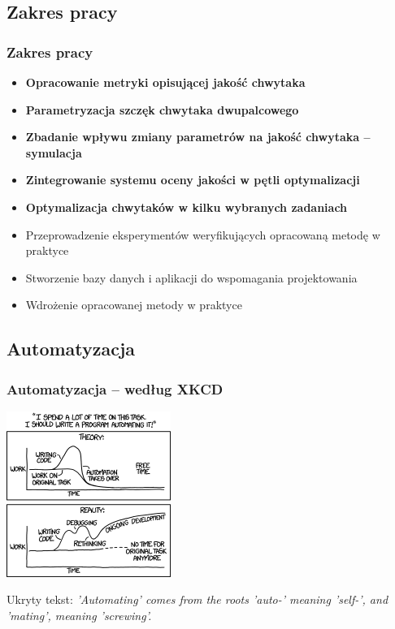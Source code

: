 \documentclass[12pt,a4paper,portrait]{beamer}
\begin{document}
\subsection{Zakres pracy}
\begin{frame}
\frametitle{Zakres pracy}
\begin{itemize}
\item \textbf{Opracowanie metryki opisującej jakość chwytaka}
\item \textbf{Parametryzacja szczęk chwytaka dwupalcowego}
\item \textbf{Zbadanie wpływu zmiany parametrów na jakość chwytaka -- symulacja}
\item \textbf{Zintegrowanie systemu oceny jakości w pętli optymalizacji}
\item \textbf{Optymalizacja chwytaków w kilku wybranych zadaniach}
\item Przeprowadzenie eksperymentów weryfikujących opracowaną metodę w praktyce
\item Stworzenie bazy danych i aplikacji do wspomagania projektowania
\item Wdrożenie opracowanej metody w praktyce
\end{itemize}
\end{frame}

\subsection{Automatyzacja}
\begin{frame}
\frametitle{Automatyzacja -- według XKCD}
\begin{center}
\includegraphics[width=0.4\textwidth]{images/automation}


Ukryty tekst: \textit{'Automating' comes from the roots 'auto-' meaning 'self-', and 'mating', meaning 'screwing'.}
\end{center}
\end{frame}
\end{document}
